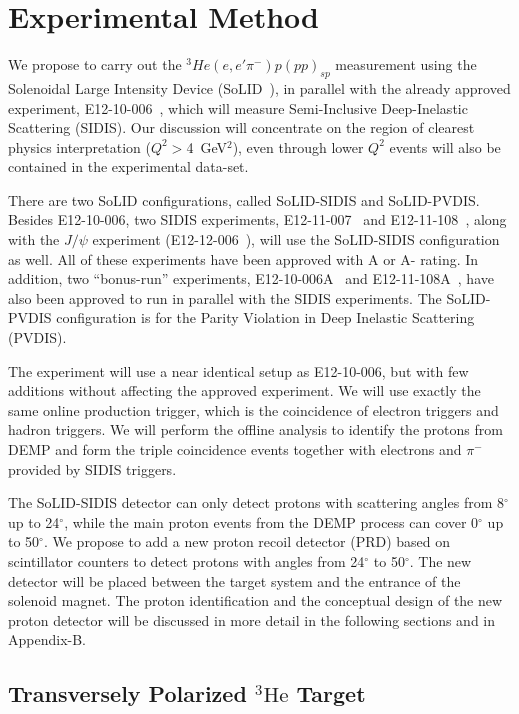 \section{Experimental Method}

We propose to carry out the $^3He(e,e'\pi^-)p(pp)_{sp}$ measurement using the
Solenoidal Large Intensity Device (SoLID~\cite{solid_pcdr}), in parallel with
the already approved experiment, E12-10-006~\cite{solid:e12-10-006}, which will
measure Semi-Inclusive Deep-Inelastic Scattering (SIDIS). 
Our discussion will concentrate on the region of clearest physics
interpretation ($Q^2>$4~GeV$^2$), even through lower $Q^2$ events will also be
contained in the experimental data-set.

There are two SoLID
configurations, called SoLID-SIDIS and SoLID-PVDIS. Besides E12-10-006, two
SIDIS experiments, E12-11-007~\cite{solid:e12-11-007} and
E12-11-108~\cite{solid:e12-11-108}, along with the $J/\psi$ experiment
(E12-12-006~\cite{solid:e12-12-006}), will use the SoLID-SIDIS
configuration as well. All of these experiments have been approved with A or A-
rating. In addition, two ``bonus-run'' experiments,
E12-10-006A~\cite{solid:e12-10-006A} and E12-11-108A~\cite{solid:e12-11-008A},
have also been approved to run in parallel with the SIDIS experiments. The
SoLID-PVDIS configuration is for the Parity Violation in Deep Inelastic
Scattering (PVDIS).

The experiment will use a near identical setup as E12-10-006, but with few
additions without affecting the approved experiment. We will use exactly the
same online production trigger, which is the coincidence of electron triggers
and hadron triggers. We will perform the offline analysis to identify the
protons from DEMP and form the triple coincidence events together with
electrons and $\pi^{-}$ provided by SIDIS triggers.

The SoLID-SIDIS detector can only detect protons with scattering angles from
8$^{\circ}$ up to 24$^{\circ}$, while the main proton events from the DEMP
process can cover 0$^{\circ}$ up to 50$^{\circ}$. We propose to add a new
proton recoil detector (PRD) based on scintillator counters to detect protons
with angles from 24$^{\circ}$ to 50$^{\circ}$. The new detector will be placed
between the target system and the entrance of the solenoid magnet. The proton
identification and the conceptual design of the new proton detector will be
discussed in more detail in the following sections and in Appendix-B.

\subsection {Transversely Polarized $\mathrm{^{3}He}$ Target}

